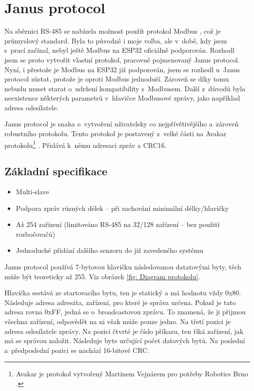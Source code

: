 \chapter{Janus protocol} \label{Protocol}
Na sběrnici RS-485 se nabízela možnost použít protokol Modbus \cite{modbus}, což je průmyslový standard.
Byla to původně i moje volba, ale v~době, kdy jsem s~prací začínal, nebyl ještě Modbus na ESP32 oficiálně podporován.
Rozhodl jsem se proto vytvořit vlastní protokol, pracovně pojmenovaný Janus protocol.
Nyní, i přestože je Modbus na ESP32 již podporován, jsem se rozhodl u~Janus protocol zůstat, protože je oproti Modbus jednoduší.
Zároveň se díky tomu nebudu muset starat o~udržení kompatibility s~Modbusem.
Další z~důvodů byla neexistence některých parametrů v~hlavičce Modbusové zprávy, jako například adresa odesílatele. 

Janus protocol je snaha o~vytvoření uživatelsky co nejpřívětivějšího a~zároveň robustního protokolu.
Tento protokol je postavený z~velké části na Avakar protokolu\footnote{Avakar je protokol vytvořený Martinem Vejnárem pro potřeby Robotics Brno \cite{robotikabrno}.} \cite{avakar}.
Přidává k~němu adresaci zpráv a CRC16.


\section{Základní specifikace}
\begin{itemize}
    \item Multi-slave
    \item Podpora zpráv různých délek -- při zachování minimální délky/hlavičky
    \item Až 254 zařízení (limitováno RS-485 na 32/128 zařízení -- bez použití rozbočovačů)
    \item Jednoduché přidání dalšího senzoru do již zavedeného systému
\end{itemize}

Janus protocol používá 7-bytovou hlavičku následovanou datatovými byty, těch může být teoreticky až 255.
Viz obrázek \ref{fig: Diagram protokolu}.

Hlavička sestává ze startovacího bytu, ten je statický a má hodnotu vždy 0x80.
Následuje adresa adresáta, zařízení, pro které je správa určena.
Pokud je tato adresa rovna 0xFF, jedná se o~broadcastovou zprávu. To znamená, že ji přijmou všechna zařízení, odpovědět na ni však může pouze jedno.
Na třetí pozici je adresa odesílatele zprávy.
Na pozici čtvrté je číslo příkazu, ten říká zařízení, jak má se správou naložit.
Následuje byte určující počet datových bytů.
Na poslední a~předposlední pozici se nachází 16-bitové CRC.

